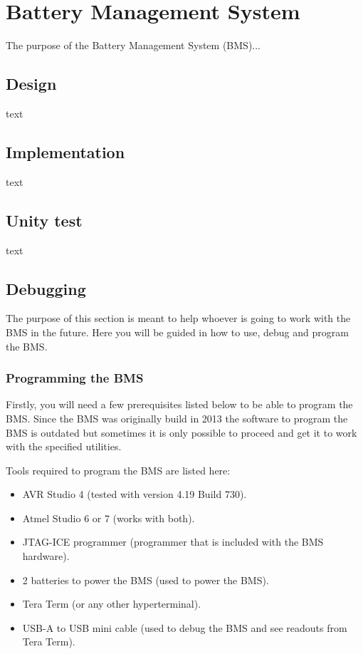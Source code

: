 \section{Battery Management System}
The purpose of the Battery Management System (BMS)...

\subsection{Design}
text

\subsection{Implementation}
text

\subsection{Unity test}
text

\subsection{Debugging}
The purpose of this section is meant to help whoever is going to work with the BMS in the future. Here you will be guided in how to use, debug and program the BMS.

\subsubsection{Programming the BMS}
Firstly, you will need a few prerequisites listed below to be able to program the BMS. Since the BMS was originally build in 2013 the software to program the BMS is outdated but sometimes it is only possible to proceed and get it to work with the specified utilities. 

Tools required to program the BMS are listed here:
	\begin{itemize}
		\item AVR Studio 4 (tested with version 4.19 Build 730).
		\item Atmel Studio 6 or 7 (works with both).
		\item JTAG-ICE programmer	(programmer that is included with the BMS hardware).
		\item 2 batteries to power the BMS (used to power the BMS).
		\item Tera Term (or any other hyperterminal).
		\item USB-A to USB mini cable	(used to debug the BMS and see readouts from Tera Term).
	\end{itemize}
	
